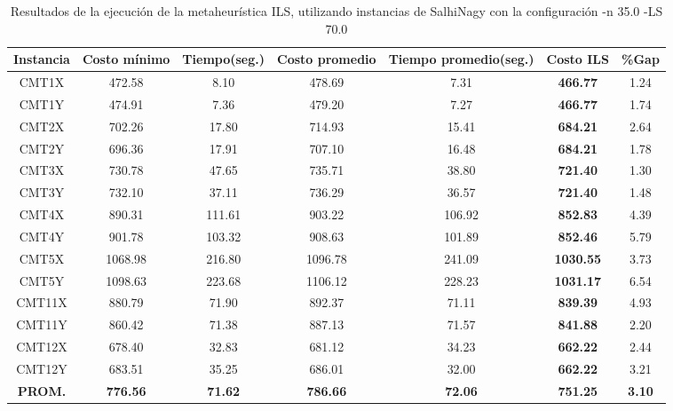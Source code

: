 \begin{table}[ht]
\caption{Resultados de la ejecución de la metaheurística ILS, utilizando instancias de SalhiNagy con la configuración -n 35.0 -LS 70.0}
\centering
\small
\begin{tabular}{c c c c c c c}
\hline\hline
Instancia & Costo mínimo & Tiempo(seg.) & Costo promedio & Tiempo promedio(seg.) & Costo ILS & \%Gap \\ [0.5ex]
\hline
CMT1X & 472.58 & 8.10 & 
478.69 & 7.31 & \bf{466.77} & 
1.24\\CMT1Y & 474.91 & 7.36 & 
479.20 & 7.27 & \bf{466.77} & 
1.74\\CMT2X & 702.26 & 17.80 & 
714.93 & 15.41 & \bf{684.21} & 
2.64\\CMT2Y & 696.36 & 17.91 & 
707.10 & 16.48 & \bf{684.21} & 
1.78\\CMT3X & 730.78 & 47.65 & 
735.71 & 38.80 & \bf{721.40} & 
1.30\\CMT3Y & 732.10 & 37.11 & 
736.29 & 36.57 & \bf{721.40} & 
1.48\\CMT4X & 890.31 & 111.61 & 
903.22 & 106.92 & \bf{852.83} & 
4.39\\CMT4Y & 901.78 & 103.32 & 
908.63 & 101.89 & \bf{852.46} & 
5.79\\CMT5X & 1068.98 & 216.80 & 
1096.78 & 241.09 & \bf{1030.55} & 
3.73\\CMT5Y & 1098.63 & 223.68 & 
1106.12 & 228.23 & \bf{1031.17} & 
6.54\\CMT11X & 880.79 & 71.90 & 
892.37 & 71.11 & \bf{839.39} & 
4.93\\CMT11Y & 860.42 & 71.38 & 
887.13 & 71.57 & \bf{841.88} & 
2.20\\CMT12X & 678.40 & 32.83 & 
681.12 & 34.23 & \bf{662.22} & 
2.44\\CMT12Y & 683.51 & 35.25 & 
686.01 & 32.00 & \bf{662.22} & 
3.21\\\bf{PROM.} & 
\bf{776.56} & \bf{71.62} & \bf{786.66} & \bf{72.06} & \bf{751.25} & \bf{3.10}\\[1ex]\hline
\end{tabular}
\label{table:nonlin}
\end{table} \clearpage
